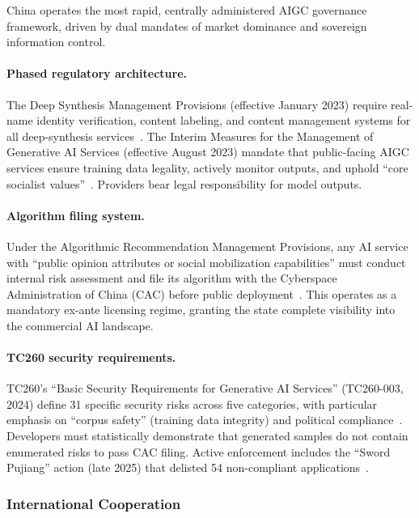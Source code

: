 China operates the most rapid, centrally administered AIGC governance framework, driven by dual mandates of market dominance and sovereign information control.

\paragraph{Phased regulatory architecture.}
The Deep Synthesis Management Provisions (effective January 2023) require real-name identity verification, content labeling, and content management systems for all deep-synthesis services~\cite{chinadeepsynthesis}. The Interim Measures for the Management of Generative AI Services (effective August 2023) mandate that public-facing AIGC services ensure training data legality, actively monitor outputs, and uphold ``core socialist values''~\cite{chinainterim2023}. Providers bear legal responsibility for model outputs.

\paragraph{Algorithm filing system.}
Under the Algorithmic Recommendation Management Provisions, any AI service with ``public opinion attributes or social mobilization capabilities'' must conduct internal risk assessment and file its algorithm with the Cyberspace Administration of China (CAC) before public deployment~\cite{chinaalgorithm}. This operates as a mandatory ex-ante licensing regime, granting the state complete visibility into the commercial AI landscape.

\paragraph{TC260 security requirements.}
TC260's ``Basic Security Requirements for Generative AI Services'' (TC260-003, 2024) define 31 specific security risks across five categories, with particular emphasis on ``corpus safety'' (training data integrity) and political compliance~\cite{tc260}. Developers must statistically demonstrate that generated samples do not contain enumerated risks to pass CAC filing. Active enforcement includes the ``Sword Pujiang'' action (late 2025) that delisted 54 non-compliant applications~\cite{chinaenforcement2025}.


\subsubsection{International Cooperation}
\label{sec:gov-intl}

